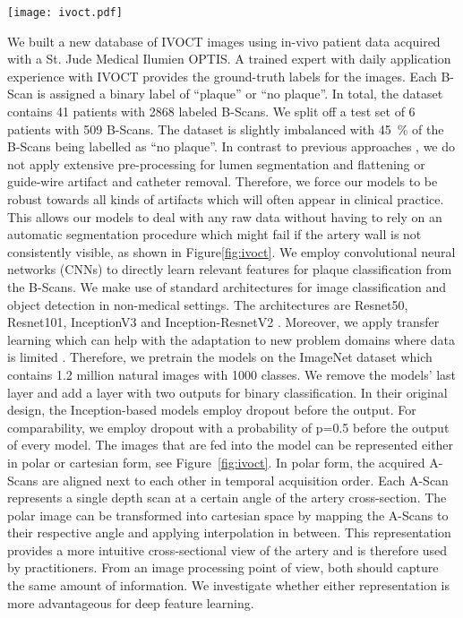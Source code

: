 \begin{figure*}
  \centering
  \texttt{[image: ivoct.pdf]}
\caption{Left, a cartesian IVOCT image is shown. Right, the polar image is shown. Note, that there are various artifacts in the vessel which impede a clear view of the vessel wall. Lipid-rich plaque is visible in this image. ‘*’ denotes the guide-wire artifact.}
\label{fig:ivoct}       %
\end{figure*}

We built a new database of IVOCT images using in-vivo patient data acquired with a St. Jude Medical Ilumien OPTIS. A trained expert with daily application experience with IVOCT provides the ground-truth labels for the images. Each B-Scan is assigned a binary label of “plaque” or “no plaque”. In total, the dataset contains 41 patients with 2868 labeled B-Scans. We split off a test set of 6 patients with 509 B-Scans. The dataset is slightly imbalanced with \SI{45}{\percent} of the B-Scans being labelled as “no plaque”. 
In contrast to previous approaches \cite{ughi2013automated,rico2016automatic}, we do not apply extensive pre-processing for lumen segmentation and flattening or guide-wire artifact and catheter removal. Therefore, we force our models to be robust towards all kinds of artifacts which will often appear in clinical practice. This allows our models to deal with any raw data without having to rely on an automatic segmentation procedure which might fail if the artery wall is not consistently visible, as shown in Figure\ref{fig:ivoct}.
We employ convolutional neural networks (CNNs) to directly learn relevant features for plaque classification from the B-Scans.  We make use of standard architectures for image classification and object detection in non-medical settings. The architectures are Resnet50, Resnet101, InceptionV3 and Inception-ResnetV2 \cite{litjens2017survey,Szegedy.2017}. Moreover, we apply transfer learning which can help with the adaptation to new problem domains where data is limited \cite{ravishankar2016understanding}. Therefore, we pretrain the models on the ImageNet dataset which contains 1.2 million natural images with 1000 classes. We remove the models’ last layer and add a layer with two outputs for binary classification. In their original design, the Inception-based models employ dropout before the output. For comparability, we employ dropout with a probability of p=0.5 before the output of every model.
The images that are fed into the model can be represented either in polar or cartesian form, see Figure~\ref{fig:ivoct}. In polar form, the acquired A-Scans are aligned next to each other in temporal acquisition order. Each A-Scan represents a single depth scan at a certain angle of the artery cross-section. The polar image can be transformed into cartesian space by mapping the A-Scans to their respective angle and applying interpolation in between. This representation provides a more intuitive cross-sectional view of the artery and is therefore used by practitioners. From an image processing point of view, both should capture the same amount of information. We investigate whether either representation is more advantageous for deep feature learning.
